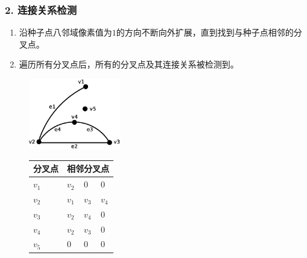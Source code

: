 \documentclass[notheorems,mathserif,table,compress]{beamer}  %
\begin{document}
\begin{frame}
\frametitle{2. 连接关系检测}
\begin{enumerate}
。
\item 沿种子点八邻域像素值为$1$的方向不断向外扩展，直到找到与种子点相邻的分叉点。
\item 遍历所有分叉点后，所有的分叉点及其连接关系被检测到。
\end{enumerate}
\begin{figure}
\begin{minipage}[b]{0.48\textwidth} 
      \centering 
      \includegraphics[width=4cm]{chap02/graph}
\caption*{\color{blue}{图}}
    \end{minipage}
\begin{minipage}[b]{0.48\textwidth} 
\begin{tabular}{p{1.2cm}<{\centering}p{0.5cm}<{\centering}p{0.5cm}<{\centering}p{0.5cm}<{\centering}}
  \hline
  分叉点 & \multicolumn{3}{c}{相邻分叉点}\\
  \hline
  \rowcolor{gray!50}
  $v_{1}$ & $v_{2}$  & $0$      & $0$  \\
  $v_{2}$ & $v_{1}$  & $v_{3}$  & $v_{4}$ \\
  \rowcolor{gray!50}
  $v_{3}$ & $v_{2}$  & $v_{4}$  & $0$\\
  $v_{4}$ & $v_{2}$  & $v_{3}$  & $0$ \\
  \rowcolor{gray!50}
  $v_{5}$ & $0$      & $0$      & $0$\\
  \hline
\end{tabular}
\caption*{\color{blue}{点---边关系}}
\end{minipage}
\end{figure}
\end{frame}
\end{document}

